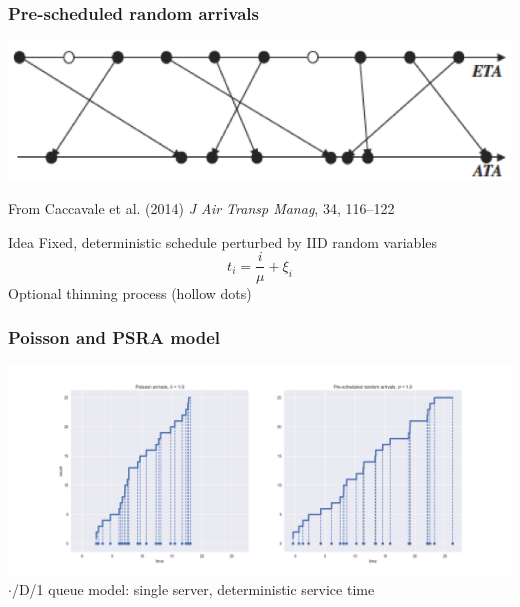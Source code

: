 \documentclass[table,aspectratio=169]{beamer}
\begin{document}
\begin{frame}[t]\frametitle{Pre-scheduled random arrivals}
    \centering
    \includegraphics[width=.65\textwidth]{psra}

    {\tiny From Caccavale et al. (2014) \emph{J Air Transp Manag}, 34, 116--122}

    \vfill

    \begin{alertblock}{Idea}
        Fixed, deterministic schedule perturbed by IID random variables
        \[ t_i = \frac{i}{\mu} + \xi_i \]
        Optional thinning process (hollow dots)
    \end{alertblock}
\end{frame}

\begin{frame}[t]\frametitle{Poisson and PSRA model}
    \centering
    \includegraphics[width=.9\textwidth]{pois_psra}
    \vfill
    \alert{$\cdot$/D/1 queue model:} single server, deterministic service time
\end{frame}
\end{document}
